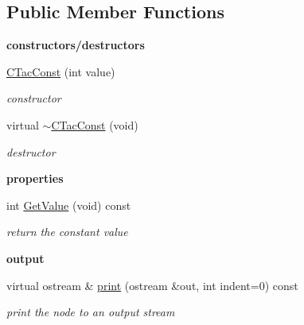 \subsection*{Public Member Functions}
\begin{Indent}{\bf constructors/destructors}\par
\begin{DoxyCompactItemize}
\item 
\hyperlink{classCTacConst_ae1606f6f886b2833252daf58419746fa}{C\-Tac\-Const} (int value)
\begin{DoxyCompactList}\small\item\em constructor \end{DoxyCompactList}\item 
\hypertarget{classCTacConst_a208c20ccd6c68143a13e0a7caed3420b}{virtual \hyperlink{classCTacConst_a208c20ccd6c68143a13e0a7caed3420b}{$\sim$\-C\-Tac\-Const} (void)}\label{classCTacConst_a208c20ccd6c68143a13e0a7caed3420b}

\begin{DoxyCompactList}\small\item\em destructor \end{DoxyCompactList}\end{DoxyCompactItemize}
\end{Indent}
\begin{Indent}{\bf properties}\par
\begin{DoxyCompactItemize}
\item 
\hypertarget{classCTacConst_afb5a11eda1904d13c3c3da4027f3f2bc}{int \hyperlink{classCTacConst_afb5a11eda1904d13c3c3da4027f3f2bc}{Get\-Value} (void) const }\label{classCTacConst_afb5a11eda1904d13c3c3da4027f3f2bc}

\begin{DoxyCompactList}\small\item\em return the constant value \end{DoxyCompactList}\end{DoxyCompactItemize}
\end{Indent}
\begin{Indent}{\bf output}\par
\begin{DoxyCompactItemize}
\item 
virtual ostream \& \hyperlink{classCTacConst_a3e43106d2d5417959f229a4da3cb8672}{print} (ostream \&out, int indent=0) const 
\begin{DoxyCompactList}\small\item\em print the node to an output stream \end{DoxyCompactList}\end{DoxyCompactItemize}
\end{Indent}
